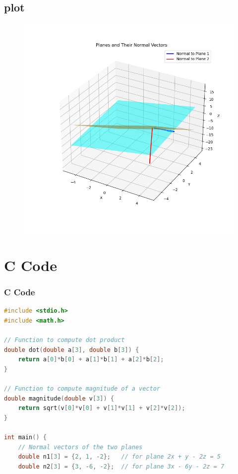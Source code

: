 \documentclass{beamer}
\begin{document}
    \subsection{plot}
       \begin{frame}[fragile]
    \begin{figure}[H]
    \centering
    \includegraphics[width = 0.6\columnwidth]{../figs/img.png}
    \caption*{}
    \label{figs}
\end{figure}
\end{frame}
\section{ C Code}
\begin{frame}[fragile]
\frametitle{C Code }
\begin{lstlisting}[language=C]
#include <stdio.h>
#include <math.h>

// Function to compute dot product
double dot(double a[3], double b[3]) {
    return a[0]*b[0] + a[1]*b[1] + a[2]*b[2];
}

// Function to compute magnitude of a vector
double magnitude(double v[3]) {
    return sqrt(v[0]*v[0] + v[1]*v[1] + v[2]*v[2]);
}

int main() {
    // Normal vectors of the two planes
    double n1[3] = {2, 1, -2};   // for plane 2x + y - 2z = 5
    double n2[3] = {3, -6, -2};  // for plane 3x - 6y - 2z = 7

 
\end{lstlisting}
\end{frame}
\end{document}

